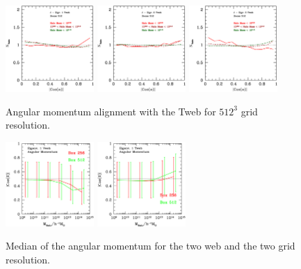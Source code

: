 \documentclass[usenatbib]{mn2e}
\begin{document}
\begin{figure}
\includegraphics[width=0.30\textwidth]{../plot2/J/512_J_T1.ps}
\includegraphics[width=0.30\textwidth]{../plot2/J/512_J_T2.ps}
\includegraphics[width=0.30\textwidth]{../plot2/J/512_J_T3.ps}
\caption{Angular momentum alignment with the Tweb for $512^3$ grid resolution.}
\end{figure}
\begin{figure}
\includegraphics[width=0.30\textwidth]{../plot2/Mass/jVWeb.ps}
\includegraphics[width=0.30\textwidth]{../plot2/Mass/jTWeb.ps}
\caption{Median of the angular momentum for the two web  and the two grid resolution.}
\end{figure}
\end{document}
